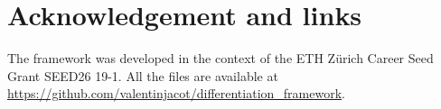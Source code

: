 \documentclass[11pt, oneside]{article}   	%
\begin{document}
\section{Acknowledgement and links}
The framework was developed in the context of the ETH Zürich Career Seed Grant SEED26 19-1. All the files are available at \url{https://github.com/valentinjacot/differentiation_framework}.



\end{document}
